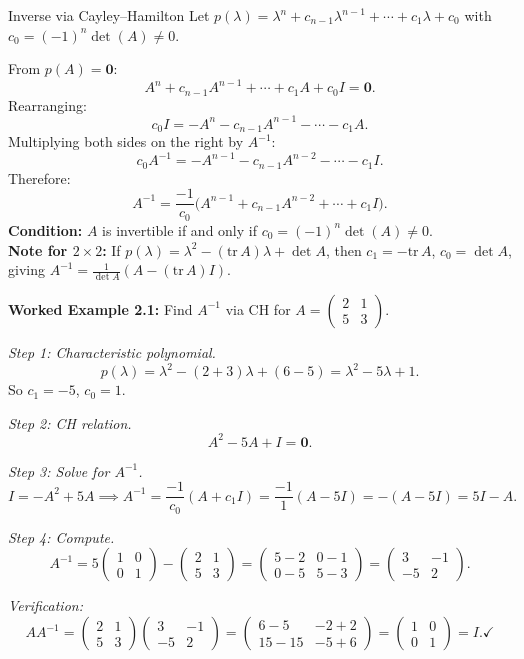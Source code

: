 \documentclass[12pt,a4paper]{article}
\begin{document}
\begin{infobox}{Inverse via Cayley--Hamilton}
Let \(p(\lambda) = \lambda^n + c_{n-1}\lambda^{n-1} + \cdots + c_1\lambda + c_0\) with \(c_0 = (-1)^n \det(A) \neq 0\).

From \(p(A) = \mathbf{0}\):
\[
  A^n + c_{n-1}A^{n-1} + \cdots + c_1 A + c_0 I = \mathbf{0}.
\]
Rearranging:
\[
  c_0 I = -A^n - c_{n-1}A^{n-1} - \cdots - c_1 A.
\]
Multiplying both sides on the right by \(A^{-1}\):
\[
  c_0 A^{-1} = -A^{n-1} - c_{n-1}A^{n-2} - \cdots - c_1 I.
\]
Therefore:
\[
  \boxed{A^{-1} = \frac{-1}{c_0}\bigl(A^{n-1} + c_{n-1}A^{n-2} + \cdots + c_1 I\bigr).}
\]
\textbf{Condition:} \(A\) is invertible if and only if \(c_0 = (-1)^n \det(A) \neq 0\).\\
\textbf{Note for \(2\times 2\):} If \(p(\lambda) = \lambda^2 - (\text{tr}\,A)\lambda + \det A\), then \(c_1 = -\text{tr}\,A\), \(c_0 = \det A\), giving \(A^{-1} = \frac{1}{\det A}(A - (\text{tr}\,A)I)\).
\end{infobox}

\textbf{Worked Example 2.1:} Find \(A^{-1}\) via CH for \(A = \begin{pmatrix} 2 & 1 \\ 5 & 3 \end{pmatrix}\).

\textit{Step 1: Characteristic polynomial.}
\[
  p(\lambda) = \lambda^2 - (2+3)\lambda + (6-5) = \lambda^2 - 5\lambda + 1.
\]
So \(c_1 = -5\), \(c_0 = 1\).

\textit{Step 2: CH relation.}
\[
  A^2 - 5A + I = \mathbf{0}.
\]

\textit{Step 3: Solve for \(A^{-1}\).}
\[
  I = -A^2 + 5A \implies A^{-1} = \frac{-1}{c_0}(A + c_1 I) = \frac{-1}{1}(A - 5I) = -(A - 5I) = 5I - A.
\]

\textit{Step 4: Compute.}
\[
  A^{-1} = 5\begin{pmatrix}1&0\\0&1\end{pmatrix} - \begin{pmatrix}2&1\\5&3\end{pmatrix}
  = \begin{pmatrix}5-2 & 0-1 \\ 0-5 & 5-3\end{pmatrix} = \begin{pmatrix}3 & -1 \\ -5 & 2\end{pmatrix}.
\]

\textit{Verification:}
\[
  AA^{-1} = \begin{pmatrix}2&1\\5&3\end{pmatrix}\begin{pmatrix}3&-1\\-5&2\end{pmatrix}
  = \begin{pmatrix}6-5 & -2+2 \\ 15-15 & -5+6\end{pmatrix} = \begin{pmatrix}1&0\\0&1\end{pmatrix} = I. \checkmark
\]
\end{document}
